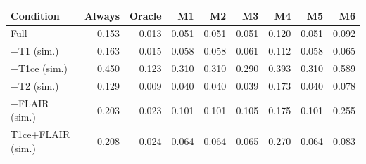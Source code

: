 \begin{tabular}{lrrrrrrrr}
\toprule
Condition & Always & Oracle & M1 & M2 & M3 & M4 & M5 & M6 \\
\midrule
Full & 0.153 & 0.013 & 0.051 & 0.051 & 0.051 & 0.120 & 0.051 & 0.092 \\
$-$T1 (sim.) & 0.163 & 0.015 & 0.058 & 0.058 & 0.061 & 0.112 & 0.058 & 0.065 \\
$-$T1ce (sim.) & 0.450 & 0.123 & 0.310 & 0.310 & 0.290 & 0.393 & 0.310 & 0.589 \\
$-$T2 (sim.) & 0.129 & 0.009 & 0.040 & 0.040 & 0.039 & 0.173 & 0.040 & 0.078 \\
$-$FLAIR (sim.) & 0.203 & 0.023 & 0.101 & 0.101 & 0.105 & 0.175 & 0.101 & 0.255 \\
T1ce+FLAIR (sim.) & 0.208 & 0.024 & 0.064 & 0.064 & 0.065 & 0.270 & 0.064 & 0.083 \\
\bottomrule
\end{tabular}
